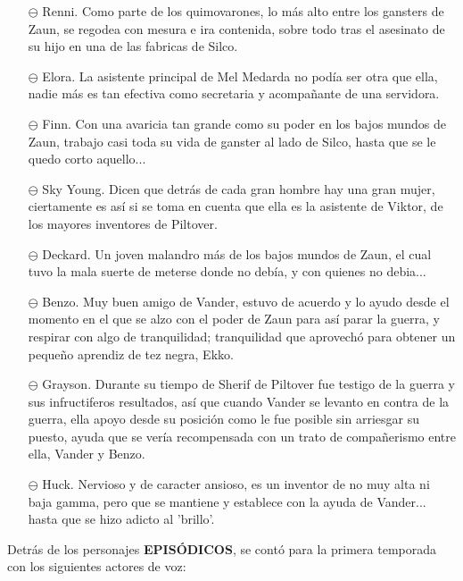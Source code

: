 \documentclass[11pt,A5]{article}
\begin{document}
\begin{itemize}
    \item[$\ominus$] Renni. Como parte de los quimovarones, lo más alto entre los gansters de Zaun, se regodea con mesura e ira contenida, sobre todo tras el asesinato de su hijo en una de las fabricas de Silco.
    \item[$\ominus$] Elora. La asistente principal de Mel Medarda no podía ser otra que ella, nadie más es tan efectiva como secretaria y acompañante de una servidora.
    \item[$\ominus$] Finn. Con una avaricia tan grande como su poder en los bajos mundos de Zaun, trabajo casi toda su vida de ganster al lado de Silco, hasta que se le quedo corto aquello...
    \item[$\ominus$] Sky Young. Dicen que detrás de cada gran hombre hay una gran mujer, ciertamente es así si se toma en cuenta que ella es la asistente de Viktor, de los mayores inventores de Piltover.
    \item[$\ominus$] Deckard. Un joven malandro más de los bajos mundos de Zaun, el cual tuvo la mala suerte de meterse donde no debía, y con quienes no debia...
    \item[$\ominus$] Benzo. Muy buen amigo de Vander, estuvo de acuerdo y lo ayudo desde el momento en el que se alzo con el poder de Zaun para así parar la guerra, y respirar con algo de tranquilidad; tranquilidad que aprovechó para obtener un pequeño aprendiz de tez negra, Ekko.
    \item[$\ominus$] Grayson. Durante su tiempo de Sherif de Piltover fue testigo de la guerra y sus infructiferos resultados, así que cuando Vander se levanto en contra de la guerra, ella apoyo desde su posición como le fue posible sin arriesgar su puesto, ayuda que se vería recompensada con un trato de compañerismo entre ella, Vander y Benzo.
    \item[$\ominus$] Huck. Nervioso y de caracter ansioso, es un inventor de no muy alta ni baja gamma, pero que se mantiene y establece con la ayuda de Vander... hasta que se hizo adicto al 'brillo'.
\end{itemize}

Detrás de los personajes {\textbf{EPISÓDICOS}}, se contó para la primera temporada con los siguientes actores de voz:
\end{document}
